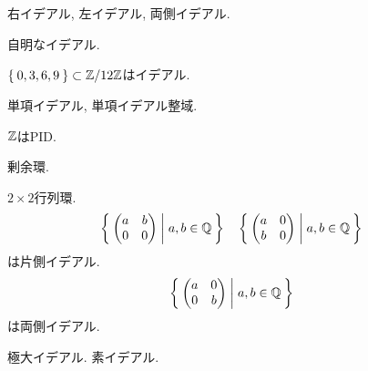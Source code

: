   \section{}
 \begin{definition}
    右イデアル, 左イデアル, 両側イデアル.
  \end{definition}
  \begin{example}
    自明なイデアル.
  \end{example}
  \begin{example}
    $\Set{0,3,6,9}\subset\mathbb{Z}/12\mathbb{Z}$はイデアル.
  \end{example}
  \begin{definition}
    単項イデアル, 単項イデアル整域.
  \end{definition}
  \begin{example}
    $\mathbb{Z}$はPID.
  \end{example}
  \begin{definition}
    剰余環.
  \end{definition}
  \begin{example}
    $2\times 2$行列環.
    \begin{align*}
      &\Set{\begin{pmatrix}a&b\\0&0\end{pmatrix}|a,b\in \mathbb{Q}}
      &&\Set{\begin{pmatrix}a&0\\b&0\end{pmatrix}|a,b\in \mathbb{Q}}
    \end{align*}
    は片側イデアル.
    \begin{align*}
      &\Set{\begin{pmatrix}a&0\\0&b\end{pmatrix}|a,b\in \mathbb{Q}}
    \end{align*}
    は両側イデアル.
  \end{example}
  \begin{definition}
    極大イデアル. 素イデアル.
  \end{definition}

